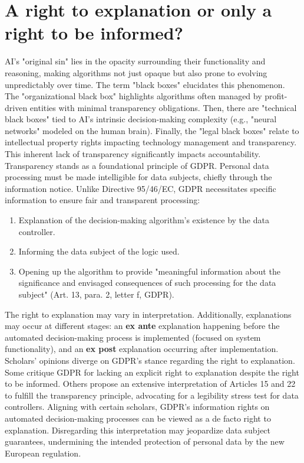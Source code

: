 \section{A right to explanation or only a right to be informed?}
AI's "original sin" lies in the opacity surrounding their functionality and reasoning, making algorithms not just opaque but also prone to evolving unpredictably over time.
\newline
The term "black boxes" elucidates this phenomenon. The "organizational black box" highlights algorithms often managed by profit-driven entities with minimal transparency obligations. Then, there are "technical black boxes" tied to AI's intrinsic decision-making complexity (e.g., "neural networks" modeled on the human brain). Finally, the "legal black boxes" relate to intellectual property rights impacting technology management and transparency.
\newline
This inherent lack of transparency significantly impacts accountability. Transparency stands as a foundational principle of GDPR. Personal data processing must be made intelligible for data subjects, chiefly through the information notice. Unlike Directive 95/46/EC, GDPR necessitates specific information to ensure fair and transparent processing:

\begin{enumerate}
    \item Explanation of the decision-making algorithm's existence by the data controller.
    \item Informing the data subject of the logic used.
    \item Opening up the algorithm to provide "meaningful information about the significance and envisaged consequences of such processing for the data subject" (Art. 13, para. 2, letter f, GDPR).
\end{enumerate}

The right to explanation may vary in interpretation. Additionally, explanations may occur at different stages: an \textbf{ex ante} explanation happening before the automated decision-making process is implemented (focused on system functionality), and an \textbf{ex post} explanation occurring after implementation.
\newline 
Scholars' opinions diverge on GDPR's stance regarding the right to explanation. Some critique GDPR for lacking an explicit right to explanation despite the right to be informed.
\newline
Others propose an extensive interpretation of Articles 15 and 22 to fulfill the transparency principle, advocating for a legibility stress test for data controllers.
\newline
Aligning with certain scholars, GDPR's information rights on automated decision-making processes can be viewed as a de facto right to explanation. Disregarding this interpretation may jeopardize data subject guarantees, undermining the intended protection of personal data by the new European regulation.
